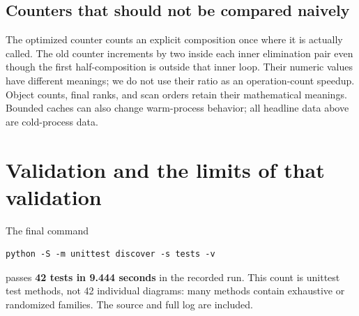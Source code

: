 \documentclass[11pt]{article}
\theoremstyle{remark}\newtheorem{remark}[theorem]{Remark}
\newcommand{\code}[1]{\texttt{\detokenize{#1}}}
\begin{document}
\subsection{Counters that should not be compared naively}
The optimized \code{compositions} counter counts an explicit composition once
where it is actually called. The old counter increments by two inside each
inner elimination pair even though the first half-composition is outside that
inner loop. Their numeric values have different meanings; we do not use their
ratio as an operation-count speedup. Object counts, final ranks, and scan
orders retain their mathematical meanings. Bounded caches can also change
warm-process behavior; all headline data above are cold-process data.

\section{Validation and the limits of that validation}
The final command
\begin{lstlisting}
python -S -m unittest discover -s tests -v
\end{lstlisting}
passes \textbf{42 tests in 9.444 seconds} in the recorded run. This count is
unittest test methods, not 42 individual diagrams: many methods contain
exhaustive or randomized families. The source and full log are included.
\end{document}
